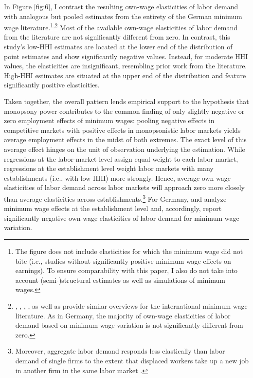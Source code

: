 \documentclass[11pt,oneside,reqno,xcolor=dvipsnames]{article} %
\newcommand\fnsep{\textsuperscript{,}} %
\begin{document}
In Figure \ref{fig:6}, I contrast the resulting own-wage elasticities of labor demand with analogous but pooled estimates from the entirety of the German minimum wage literature.\footnote{The figure does not include elasticities for which the minimum wage did not bite (i.e., studies without significantly positive minimum wage effects on earnings). To ensure comparability with this paper, I also do not take into account (semi-)structural estimates as well as simulations of minimum wages.}\fnsep\footnote{\citet{AzarEtAl2019a}, \citet{BaileyEtAl2021}, \citet{BrownHamermesh2019}, \citet{Dube2019}, \citet{HarasztosiLindner2019} as well as \citet{DerenoncourtMontialoux2021} provide similar overviews for the international minimum wage literature. As in Germany, the majority of own-wage elasticities of labor demand based on minimum wage variation is not significantly different from zero.} Most of the available own-wage elasticities of labor demand from the literature are not significantly different from zero. In contrast, this study's low-HHI estimates are located at the lower end of the distribution of point estimates and show significantly negative values. Instead, for moderate HHI values, the elasticities are insignificant, resembling prior work from the literature. High-HHI estimates are situated at the upper end of the distribution and feature significantly positive elasticities.

Taken together, the overall pattern lends empirical support to the hypothesis that monopsony power contributes to the common finding of only slightly negative or zero employment effects of minimum wages: pooling negative effects in competitive markets with positive effects in monopsonistic labor markets yields average employment effects in the midst of both extremes. The exact level of this average effect hinges on the unit of observation underlying the estimation. While regressions at the labor-market level assign equal weight to each labor market, regressions at the establishment level weight labor markets with many establishments (i.e., with low HHI) more strongly. Hence, average own-wage elasticities of labor demand across labor markets will approach zero more closely than average elasticities across establishments.\footnote{Moreover, aggregate labor demand responds less elastically than labor demand of single firms to the extent that displaced workers take up a new job in another firm in the same labor market \citep{Hamermesh1993}.} For Germany, \citet{BosslerGerner2020} and \citet{DustmannEtAl2021} analyze minimum wage effects at the establishment level and, accordingly, report significantly negative own-wage elasticities of labor demand for minimum wage variation.
\end{document}
